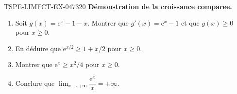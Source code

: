 \begin{exercice}{TSPE-LIMFCT-EX-047}{3}{20}
\textbf{Démonstration de la croissance comparee.}
\begin{enumerate}
  \item Soit $g(x) = \mathrm{e}^x - 1 - x$. Montrer que $g'(x) = \mathrm{e}^x - 1$ et que $g(x) \geq 0$ pour $x \geq 0$.
  \item En déduire que $\mathrm{e}^{x/2} \geq 1 + x/2$ pour $x \geq 0$.
  \item Montrer que $\mathrm{e}^x \geq x^2/4$ pour $x \geq 0$.
  \item Conclure que $\lim_{x \to +\infty} \dfrac{\mathrm{e}^x}{x} = +\infty$.
\end{enumerate}
\end{exercice}
